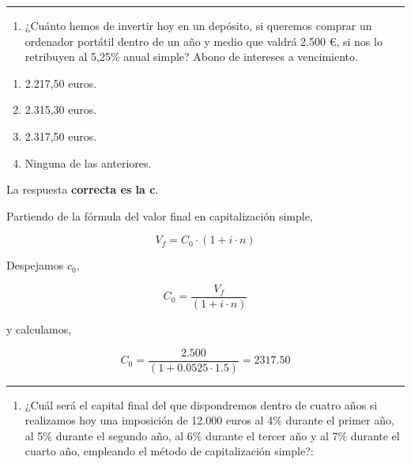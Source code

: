 \documentclass[
  letterpaper,
  DIV=11,
  numbers=noendperiod]{scrreprt}
\providecommand{\tightlist}{%
  \setlength{\itemsep}{0pt}\setlength{\parskip}{0pt}}\usepackage{longtable,booktabs,array}
\begin{document}
\begin{center}\rule{0.5\linewidth}{0.5pt}\end{center}

\begin{enumerate}
\def\labelenumi{\arabic{enumi}.}
\setcounter{enumi}{98}
\tightlist
\item
  ¿Cuánto hemos de invertir hoy en un depósito, si queremos comprar un
  ordenador portátil dentro de un año y medio que valdrá 2.500 €, si nos
  lo retribuyen al 5,25\% anual simple? Abono de intereses a
  vencimiento.
\end{enumerate}

\begin{enumerate}
\def\labelenumi{\alph{enumi}.}
\item
  2.217,50 euros.
\item
  2.315,30 euros.
\item
  2.317,50 euros.
\item
  Ninguna de las anteriores.
\end{enumerate}

\begin{tcolorbox}[enhanced jigsaw, left=2mm, opacityback=0, colback=white, breakable, arc=.35mm, bottomrule=.15mm, rightrule=.15mm, toprule=.15mm, leftrule=.75mm, colframe=quarto-callout-tip-color-frame]
\begin{minipage}[t]{5.5mm}
\textcolor{quarto-callout-tip-color}{\faLightbulb}
\end{minipage}%
\begin{minipage}[t]{\textwidth - 5.5mm}

La respuesta \textbf{correcta es la c}.

Partiendo de la fórmula del valor final en capitalización simple,

\[V_f=C_0\cdot\left(1+i\cdot n\right)\]

Despejamos \(c_0\),

\[C_0=\frac{V_f }{ \left(1+i\cdot n\right)}\]

y calculamos,

\[C_0=\frac{2.500}{\left(1+0.0525\cdot1.5\right)}=2317.50\]

\end{minipage}%
\end{tcolorbox}

\begin{center}\rule{0.5\linewidth}{0.5pt}\end{center}

\begin{enumerate}
\def\labelenumi{\arabic{enumi}.}
\setcounter{enumi}{99}
\tightlist
\item
  ¿Cuál será el capital final del que dispondremos dentro de cuatro años
  si realizamos hoy una imposición de 12.000 euros al 4\% durante el
  primer año, al 5\% durante el segundo año, al 6\% durante el tercer
  año y al 7\% durante el cuarto año, empleando el método de
  capitalización simple?:
\end{enumerate}
\end{document}
